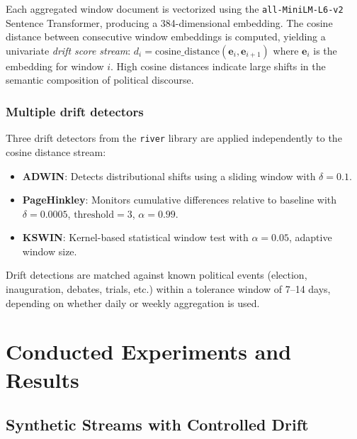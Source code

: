 \documentclass[
	a4paper,
	10pt,
	unnumberedsections,
	twoside,
]{LTJournalArticle}
\begin{document}
Each aggregated window document is vectorized using the \texttt{all-MiniLM-L6-v2} Sentence Transformer, producing a 384-dimensional embedding. The cosine distance between consecutive window embeddings is computed, yielding a univariate \textit{drift score stream}: $d_i = \text{cosine\_distance}(\mathbf{e}_i, \mathbf{e}_{i+1})$ where $\mathbf{e}_i$ is the embedding for window $i$. High cosine distances indicate large shifts in the semantic composition of political discourse.

\subsubsection{Multiple drift detectors}

Three drift detectors from the \texttt{river} library are applied independently to the cosine distance stream:
\begin{itemize}
    \item \textbf{ADWIN}: Detects distributional shifts using a sliding window with $\delta = 0.1$.
    \item \textbf{PageHinkley}: Monitors cumulative differences relative to baseline with $\delta = 0.0005$, $\text{threshold} = 3$, $\alpha = 0.99$.
    \item \textbf{KSWIN}: Kernel-based statistical window test with $\alpha = 0.05$, adaptive window size.
\end{itemize}

Drift detections are matched against known political events (election, inauguration, debates, trials, etc.) within a tolerance window of 7--14 days, depending on whether daily or weekly aggregation is used.


\section{Conducted Experiments and Results}


\subsection{Synthetic Streams with Controlled Drift}
\end{document}
